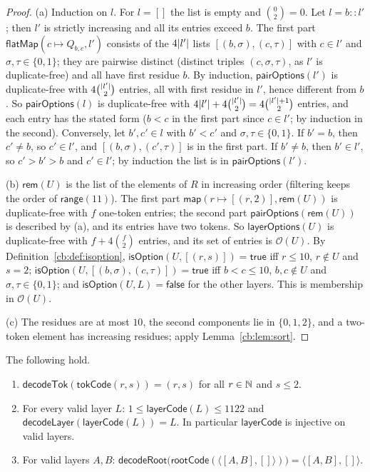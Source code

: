 \begin{proof}
(a) Induction on $l$. For $l=[]$ the list is empty and $\binom02=0$. Let $l=b\mathbin{::}l'$; then $l'$ is strictly
increasing and all its entries exceed $b$. The first part $\mathsf{flatMap}(c\mapsto Q_{b,c},l')$ consists of the
$4\lvert l'\rvert$ lists $[(b,\sigma),(c,\tau)]$ with $c\in l'$ and $\sigma,\tau\in\{0,1\}$; they are pairwise distinct
(distinct triples $(c,\sigma,\tau)$, as $l'$ is duplicate-free) and all have first residue $b$. By induction,
$\mathsf{pairOptions}(l')$ is duplicate-free with $4\binom{\lvert l'\rvert}2$ entries, all with first residue in $l'$, hence
different from $b$. So $\mathsf{pairOptions}(l)$ is duplicate-free with
$4\lvert l'\rvert+4\binom{\lvert l'\rvert}2=4\binom{\lvert l'\rvert+1}2$ entries, and each entry has the stated form ($b<c$ in the first
part since $c\in l'$; by induction in the second). Conversely, let $b',c'\in l$ with $b'<c'$ and
$\sigma,\tau\in\{0,1\}$. If $b'=b$, then $c'\ne b$, so $c'\in l'$, and $[(b,\sigma),(c',\tau)]$ is in the first part.
If $b'\ne b$, then $b'\in l'$, so $c'>b'>b$ and $c'\in l'$; by induction the list is in $\mathsf{pairOptions}(l')$.

(b) $\mathsf{rem}(U)$ is the list of the elements of $R$ in increasing order (filtering keeps the order of
$\mathsf{range}(11)$). The first part $\mathsf{map}(r\mapsto[(r,2)],\mathsf{rem}(U))$ is duplicate-free with $f$
one-token entries; the second part $\mathsf{pairOptions}(\mathsf{rem}(U))$ is described by (a), and its entries have
two tokens. So $\mathsf{layerOptions}(U)$ is duplicate-free with $f+4\binom f2$ entries, and its set of entries is
$\mathcal O(U)$. By Definition~\ref{cb:def:isoption}, $\mathsf{isOption}(U,[(r,s)])=\mathsf{true}$ iff $r\le10$,
$r\notin U$ and $s=2$; $\mathsf{isOption}(U,[(b,\sigma),(c,\tau)])=\mathsf{true}$ iff $b<c\le10$, $b,c\notin U$ and
$\sigma,\tau\in\{0,1\}$; and $\mathsf{isOption}(U,L)=\mathsf{false}$ for the other layers. This is membership in
$\mathcal O(U)$.

(c) The residues are at most $10$, the second components lie in $\{0,1,2\}$, and a two-token element has increasing
residues; apply Lemma~\ref{cb:lem:sort}.
\end{proof}

\begin{lemma}\label{cb:lem:decode}
The following hold.
\begin{enumerate}[label=(\alph*)]
\item $\mathsf{decodeTok}(\mathsf{tokCode}(r,s))=(r,s)$ for all $r\in\mathbb N$ and $s\le2$.
\item For every valid layer $L$: $1\le\mathsf{layerCode}(L)\le1122$ and
  $\mathsf{decodeLayer}(\mathsf{layerCode}(L))=L$. In particular $\mathsf{layerCode}$ is injective on valid layers.
\item For valid layers $A,B$:
  $\mathsf{decodeRoot}\big(\mathsf{rootCode}(\langle[A,B],[]\rangle)\big)=\langle[A,B],[]\rangle$.
\end{enumerate}
\end{lemma}

